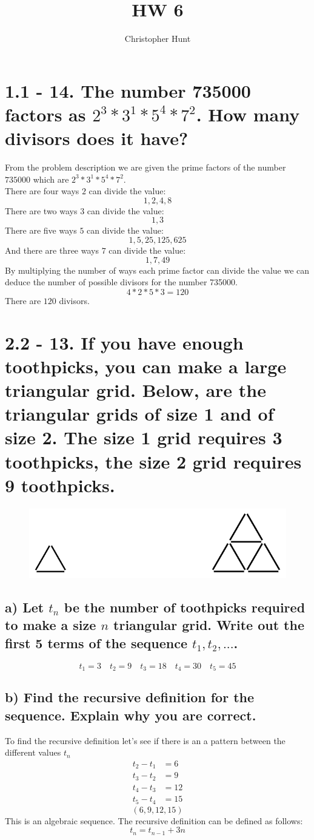 \documentclass{article}
\title{HW 6}
\author{Christopher Hunt}
\date{}
\begin{document}
\pagestyle{fancy}
\fancyhf{}
\rhead{\thepage}
\maketitle

\section*{1.1 - 14. The number 735000 factors as $2^3*3^1*5^4*7^2$. How many divisors does it have?}
From the problem description we are given the prime factors of the number $735000$ which are $2^3*3^1*5^4*7^2$.
$$$$ 
There are four ways $2$ can divide the value:
$$1,2,4,8$$
There are two ways $3$ can divide the value:
$$1,3$$
There are five ways $5$ can divide the value:
$$1,5,25,125,625$$
And there are three ways $7$ can divide the value:
$$1,7,49$$
By multiplying the number of ways each prime factor can divide the value we can deduce the number of possible divisors for the number 735000.
$$4*2*5*3=120$$
There are $120$ divisors. 

\newpage

\section*{2.2 - 13. If you have enough toothpicks, you can make a large triangular grid. Below, are the triangular grids of size 1 and of size 2. The size 1 grid requires 3 toothpicks, the size 2 grid requires 9 toothpicks.}
\begin{figure}[H]
    \includegraphics*[width=1\linewidth]{2_2_13.png}
\end{figure}
\subsection*{a) Let $t_n$ be the number of toothpicks required to make a size $n$ triangular grid. Write out the first 5 terms of the sequence $t_1,t_2,...$.}
$$t_1 = 3 \quad t_2 = 9 \quad t_3 = 18 \quad t_4 = 30 \quad t_5 = 45$$
\subsection*{b) Find the recursive definition for the sequence. Explain why you are correct.}
To find the recursive definition let's see if there is an a pattern between the different values $t_n$
\begin{align*}
    t_2-t_1 &= 6 \\
    t_3-t_2 &= 9 \\
    t_4-t_3 &= 12 \\
    t_5-t_4 &= 15
\end{align*}
$$(6,9,12,15)$$
This is an algebraic sequence. The recursive definition can be defined as follows:
$$t_n = t_{n-1} + 3n$$
\end{document}

